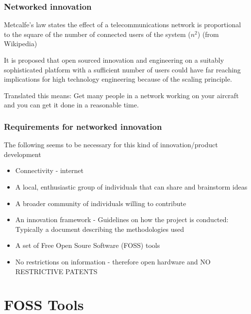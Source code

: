 \documentclass{beamer}
\begin{document}
\begin{frame}
\frametitle{Networked innovation}

Metcalfe's law states the effect of a telecommunications network is proportional to the square of the number of connected users of the system ($n^2$) (from Wikipedia)

It is proposed that open sourced innovation and engineering on a suitably sophisticated platform with a sufficient number of users could have far reaching implications for high technology engineering because of the scaling principle.

Translated this means:  Get many people in a network working on your aircraft and you can get it done in a reasonable time.

\end{frame}



\begin{frame}
\frametitle{Requirements for networked innovation}

The following seems to be necessary for this kind of innovation/product development

\begin{itemize}
\item Connectivity - internet
\item A local, enthusiastic group of individuals that can share and brainstorm ideas %
\item A broader community of individuals willing to contribute
\item An innovation framework - Guidelines on how the project is conducted:  Typically a document describing the methodologies used
\item A set of Free Open Soure Software (FOSS) tools
\item No restrictions on information - therefore open hardware and NO RESTRICTIVE PATENTS
\end{itemize}
\end{frame}


\section{FOSS Tools}

\end{document}
